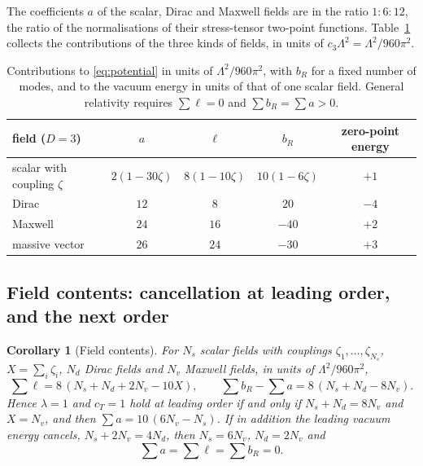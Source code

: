 \documentclass[11pt,a4paper]{article}
\theoremstyle{stmt}
\newtheorem{corollary}[theorem]{Corollary}
\theoremstyle{defn}
\theoremstyle{rmk}
\numberwithin{equation}{section}
\begin{document}
The coefficients $a$ of the scalar, Dirac and Maxwell fields are in the ratio $1:6:12$, the ratio of the normalisations of their stress-tensor two-point functions. Table~\ref{tab:species} collects the contributions of the three kinds of fields, in units of $c_3\Lambda^2=\Lambda^2/960\pi^2$.

\begin{table}[h]
\centering\small
\begin{tabular}{lcccc}
\toprule
field ($D=3$) & $a$ & $\ell$ & $b_R$ & zero-point energy\\
\midrule
scalar with coupling $\zeta$ & $2(1-30\zeta)$ & $8(1-10\zeta)$ & $10(1-6\zeta)$ & $+1$\\
Dirac & $12$ & $8$ & $20$ & $-4$\\
Maxwell & $24$ & $16$ & $-40$ & $+2$\\
massive vector & $26$ & $24$ & $-30$ & $+3$\\
\bottomrule
\end{tabular}
\caption{Contributions to \eqref{eq:potential} in units of $\Lambda^2/960\pi^2$, with $b_R$ for a fixed number of modes, and to the vacuum energy in units of that of one scalar field. General relativity requires $\sum\ell=0$ and $\sum b_R=\sum a>0$.}\label{tab:species}
\end{table}

\subsection{Field contents: cancellation at leading order, and the next order}\label{sec:content}

\begin{corollary}[Field contents]\label{cor:content}
For $N_s$ scalar fields with couplings $\zeta_1,\dots,\zeta_{N_s}$, $X=\sum_i\zeta_i$, $N_d$ Dirac fields and $N_v$ Maxwell fields, in units of $\Lambda^2/960\pi^2$,
\begin{equation}\label{eq:content}
\sum\ell=8\,(N_s+N_d+2N_v-10X),\qquad\sum b_R-\sum a=8\,(N_s+N_d-8N_v).
\end{equation}
Hence $\lambda=1$ and $c_T=1$ hold at leading order if and only if $N_s+N_d=8N_v$ and $X=N_v$, and then $\sum a=10\,(6N_v-N_s)$. If in addition the leading vacuum energy cancels, $N_s+2N_v=4N_d$, then $N_s=6N_v$, $N_d=2N_v$ and
\begin{equation}\label{eq:N4}
\sum a=\sum\ell=\sum b_R=0 .
\end{equation}
\end{corollary}
\end{document}
